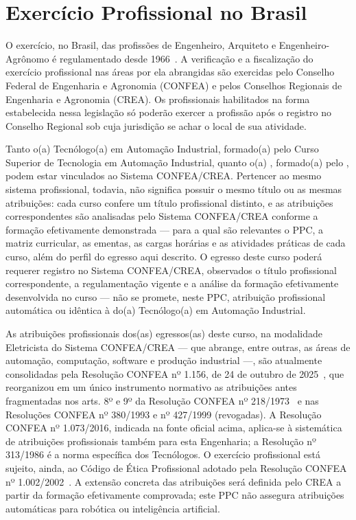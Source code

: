 \section{Exercício Profissional no Brasil}
\label{sec:exercicio_profissional}

O exercício, no Brasil, das profissões de Engenheiro, Arquiteto e Engenheiro-Agrônomo é regulamentado desde 1966~\cite{brasil_lei_5194_1966}. A verificação e a fiscalização do exercício profissional nas áreas por ela abrangidas são exercidas pelo Conselho Federal de Engenharia e Agronomia (CONFEA) e pelos Conselhos Regionais de Engenharia e Agronomia (CREA). Os profissionais habilitados na forma estabelecida nessa legislação só poderão exercer a profissão após o registro no Conselho Regional sob cuja jurisdição se achar o local de sua atividade.

Tanto o(a) Tecnólogo(a) em Automação Industrial, formado(a) pelo Curso Superior de Tecnologia em Automação Industrial, quanto o(a) \ppctitulacao, formado(a) pelo \ppccurso, podem estar vinculados ao Sistema CONFEA/CREA. Pertencer ao mesmo sistema profissional, todavia, não significa possuir o mesmo título ou as mesmas atribuições: cada curso confere um título profissional distinto, e as atribuições correspondentes são analisadas pelo Sistema CONFEA/CREA conforme a formação efetivamente demonstrada — para a qual são relevantes o PPC, a matriz curricular, as ementas, as cargas horárias e as atividades práticas de cada curso, além do perfil do egresso aqui descrito. O egresso deste curso poderá requerer registro no Sistema CONFEA/CREA, observados o título profissional correspondente, a regulamentação vigente e a análise da formação efetivamente desenvolvida no curso — não se promete, neste PPC, atribuição profissional automática ou idêntica à do(a) Tecnólogo(a) em Automação Industrial.

As atribuições profissionais dos(as) egressos(as) deste curso, na modalidade Eletricista do Sistema CONFEA/CREA — que abrange, entre outras, as áreas de automação, computação, software e produção industrial —, são atualmente consolidadas pela Resolução CONFEA nº 1.156, de 24 de outubro de 2025~\cite{confea_1156_2025}, que reorganizou em um único instrumento normativo as atribuições antes fragmentadas nos arts. 8º e 9º da Resolução CONFEA nº 218/1973~\cite{confea_218_1973} e nas Resoluções CONFEA nº 380/1993 e nº 427/1999 (revogadas). A Resolução CONFEA nº 1.073/2016, indicada na fonte oficial acima, aplica-se à sistemática de atribuições profissionais também para esta Engenharia; a Resolução nº 313/1986 é a norma específica dos Tecnólogos. O exercício profissional está sujeito, ainda, ao Código de Ética Profissional adotado pela Resolução CONFEA nº 1.002/2002~\cite{confea_1002_2002}. A extensão concreta das atribuições será definida pelo CREA a partir da formação efetivamente comprovada; este PPC não assegura atribuições automáticas para robótica ou inteligência artificial.

